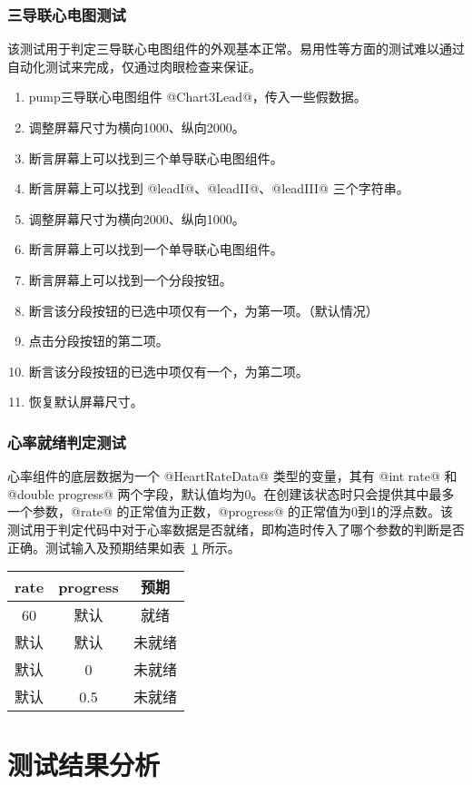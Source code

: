 \subsubsection{三导联心电图测试}

该测试用于判定三导联心电图组件的外观基本正常。易用性等方面的测试难以通过自动化测试来完成，仅通过肉眼检查来保证。

\begin{enumerate}
    \item pump三导联心电图组件 @Chart3Lead@，传入一些假数据。
    \item 调整屏幕尺寸为横向1000、纵向2000。
    \item 断言屏幕上可以找到三个单导联心电图组件。
    \item 断言屏幕上可以找到 @leadI@、@leadII@、@leadIII@ 三个字符串。
    \item 调整屏幕尺寸为横向2000、纵向1000。
    \item 断言屏幕上可以找到一个单导联心电图组件。
    \item 断言屏幕上可以找到一个分段按钮。
    \item 断言该分段按钮的已选中项仅有一个，为第一项。（默认情况）
    \item 点击分段按钮的第二项。
    \item 断言该分段按钮的已选中项仅有一个，为第二项。
    \item 恢复默认屏幕尺寸。
\end{enumerate}

\subsubsection{心率就绪判定测试}

心率组件的底层数据为一个 @HeartRateData@ 类型的变量，其有 @int rate@ 和 @double progress@ 两个字段，默认值均为0。在创建该状态时只会提供其中最多一个参数，@rate@ 的正常值为正数，@progress@ 的正常值为0到1的浮点数。该测试用于判定代码中对于心率数据是否就绪，即构造时传入了哪个参数的判断是否正确。测试输入及预期结果如表~\ref{tab:heart-rate-ready} 所示。

\begin{table}[!ht]
    \centering
    \label{tab:heart-rate-ready}
    \begin{tabular}{|c|c|c|}
        \hline
        rate & progress & 预期  \\
        \hline
        60   & 默认       & 就绪  \\
        \hline
        默认   & 默认       & 未就绪 \\
        \hline
        默认   & 0        & 未就绪 \\
        \hline
        默认   & 0.5      & 未就绪 \\
        \hline
    \end{tabular}
\end{table}


\section{测试结果分析}\label{sec:test-result}

